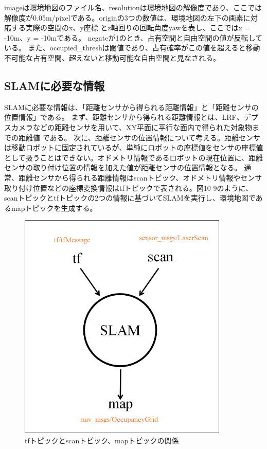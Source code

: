 imageは環境地図のファイル名、resolutionは環境地図の解像度であり、ここでは解像度が0.05m/pixelである。originの3つの数値は、環境地図の左下の画素に対応する実際の空間のx、y座標  とz軸回りの回転角度yawを表し、ここではx = -10m、y = -10mである。 negateが1のとき、占有空間と自由空間の値が反転している。  また、occupied\_threshは閾値であり、占有確率がこの値を超えると移動不可能な占有空間、超えないと移動可能な自由空間と見なされる。

\subsection{SLAMに必要な情報}

SLAMに必要な情報は、「距離センサから得られる距離情報」と「距離センサの位置情報」である。
まず、距離センサから得られる距離情報とは、LRF、デプスカメラなどの距離センサを用いて、XY平面に平行な面内で得られた対象物までの距離値  である。
次に、距離センサの位置情報について考える。距離センサは移動ロボットに固定されているが、単純にロボットの座標値をセンサの座標値として扱うことはできない。オドメトリ情報であるロボットの現在位置に、距離センサの取り付け位置の情報を加えた値が距離センサの位置情報となる。
通常、距離センサから得られる距離情報はscanトピック、オドメトリ情報やセンサ取り付け位置などの座標変換情報はtfトピックで表される。図10-9のように、scanトピックとtfトピックの2つの情報に基づいてSLAMを実行し、環境地図であるmapトピックを生成する。

\begin{figure}[htp]
  \centering
  \includegraphics[width=10cm]{pictures/chapter10/pic_10_09.png}
  \caption{tfトピックとscanトピック、mapトピックの関係}
\end{figure}

